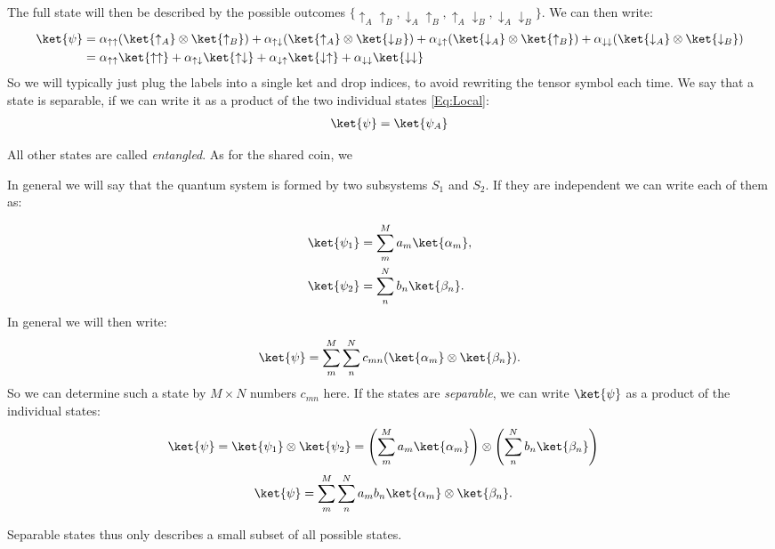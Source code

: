 The full state will then be described by the possible outcomes $\{\uparrow_A\uparrow_B,\downarrow_A\uparrow_B,\uparrow_A\downarrow_B, \downarrow_A\downarrow_B\}$. We can then write:
\begin{align}
\ket{\psi} &= \alpha_{\uparrow\uparrow}(\ket{\uparrow_A}\otimes\ket{\uparrow_B})+\alpha_{\uparrow\downarrow}(\ket{\uparrow_A}\otimes\ket{\downarrow_B})+\alpha_{\downarrow\uparrow}(\ket{\downarrow_A}\otimes\ket{\uparrow_B})+\alpha_{\downarrow\downarrow}(\ket{\downarrow_A}\otimes\ket{\downarrow_B})\\
&= \alpha_{\uparrow\uparrow}\ket{\uparrow\uparrow}+\alpha_{\uparrow\downarrow}\ket{\uparrow\downarrow}+\alpha_{\downarrow\uparrow}\ket{\downarrow \uparrow}+\alpha_{\downarrow\downarrow}\ket{\downarrow\downarrow}
\end{align}
So we will typically just plug the labels into a single ket and drop indices, to avoid rewriting the tensor symbol each time. We say that a state is separable, if we can write it as a product of the two individual states \eqref{Eq:Local}:
\begin{align}
\ket{\psi} = \ket{\psi_A}
\end{align}

All other states are called \textit{entangled}. As for the shared coin, we


In general we will say that the quantum system is formed by two subsystems $S_1$ and $S_2$. If they are independent we can write each of them as:

\begin{align}
				\ket{\psi_1}&=\sum_m^M a_m \ket{\alpha_m},\\
				\ket{\psi_2}&=\sum_n^N b_n \ket{\beta_n}.
			
\end{align}
In general we will then write:
\begin{align}
\ket{\psi}=\sum_m^M \sum_n^N c_{mn}(\ket{\alpha_m}\otimes \ket{\beta_n}).
\end{align}
So we can determine such a state by $M \times N$ numbers $c_{mn}$ here.  If the states are \textit{separable}, we can write $\ket{\psi}$ as a product of the individual states:
\begin{align}
 \label{eq:psientangled} 
	\ket{\psi}	&=\ket{\psi_1}\otimes\ket{\psi_2}=\left(\sum_m^M a_m \ket{\alpha_m}\right) \otimes \left(\sum_n^N b_n \ket{\beta_n}\right)
\end{align}
\begin{align}
\ket{\psi}	&=\sum_m^M \sum_n^N a_m b_n \ket{\alpha_m} \otimes \ket{\beta_n}. \label{eq:psientangled3} 
\end{align}

Separable states thus only describes a small subset of all possible states. 